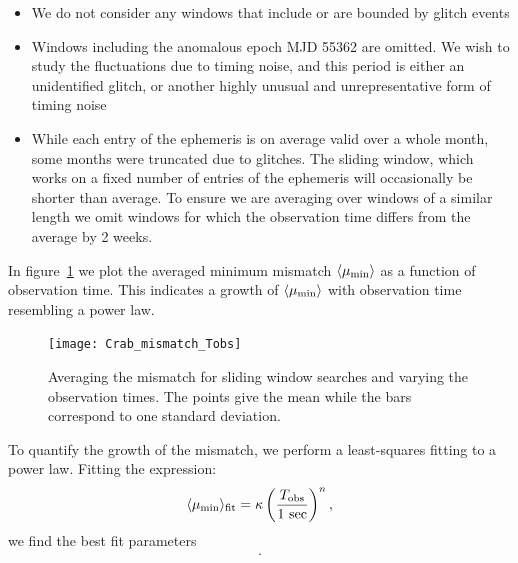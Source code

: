 \documentclass[../full_thesis/full_thesis.tex]{subfiles}
\newcommand{\thisdir}{../timing_noise_in_CGW}
\begin{document}
\begin{itemize}
    \item We do not consider any windows that
    include or are bounded by glitch events

    \item Windows including the anomalous epoch MJD 55362 are omitted. We
    wish to study the fluctuations due to timing noise, and this
    period is either an unidentified glitch, or another highly unusual and
    unrepresentative form of timing noise

   \item While each entry of the ephemeris is on average valid over a whole
   month, some months were truncated due to glitches. The sliding window, which
   works on a fixed number of entries of the ephemeris will occasionally be
   shorter than average. To ensure we are averaging over windows of a
   similar length we omit windows for which the observation time differs from
   the average by 2 weeks.

\end{itemize}

In figure~\ref{fig: mismatch Tobs} we plot the averaged minimum
mismatch $\langle\mu_{\mathrm{min}}\rangle$ as a function of observation time.
This indicates a growth of $\langle\mu_{\mathrm{min}}\rangle$ with observation time
resembling a power law.
\begin{figure}[ht]
\centering
\texttt{[image: Crab\_mismatch\_Tobs]}
\caption{Averaging the mismatch for sliding window searches and varying the
observation times. The points give the mean while the bars correspond to one
standard deviation.}
\label{fig: mismatch Tobs}
\end{figure}

To quantify the growth of the mismatch, we perform a least-squares fitting
to a power law. Fitting the expression:
\begin{equation}
\langle\mu_{\mathrm{min}}\rangle_{\textrm{fit}} = \kappa
                                   \left(\frac{T_{\textrm{obs}}}{1\textrm{ sec}}\right)^{n},
\end{equation}
we find the best fit parameters
\begin{align}
    .
    \label{eqn: fit values}
\end{align}
\end{document}

